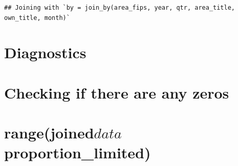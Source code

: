 \documentclass[
]{article}
\newenvironment{Shaded}{\begin{snugshade}}{\end{snugshade}}
\newcommand{\AttributeTok}[1]{\textcolor[rgb]{0.13,0.29,0.53}{#1}}
\newcommand{\CommentTok}[1]{\textcolor[rgb]{0.56,0.35,0.01}{\textit{#1}}}
\newcommand{\DecValTok}[1]{\textcolor[rgb]{0.00,0.00,0.81}{#1}}
\newcommand{\FunctionTok}[1]{\textcolor[rgb]{0.13,0.29,0.53}{\textbf{#1}}}
\newcommand{\NormalTok}[1]{#1}
\newcommand{\OtherTok}[1]{\textcolor[rgb]{0.56,0.35,0.01}{#1}}
\newcommand{\SpecialCharTok}[1]{\textcolor[rgb]{0.81,0.36,0.00}{\textbf{#1}}}
\begin{document}
\begin{Shaded}
\end{Shaded}

\begin{verbatim}
## Joining with `by = join_by(area_fips, year, qtr, area_title, own_title, month)`
\end{verbatim}

\hypertarget{diagnostics}{%
\section{Diagnostics}\label{diagnostics}}

\hypertarget{checking-if-there-are-any-zeros}{%
\section{Checking if there are any
zeros}\label{checking-if-there-are-any-zeros}}

\hypertarget{rangejoineddataproportion_limited}{%
\section{\texorpdfstring{range(joined\(data\)proportion\_limited)}{range(joineddataproportion\_limited)}}\label{rangejoineddataproportion_limited}}
\end{document}
